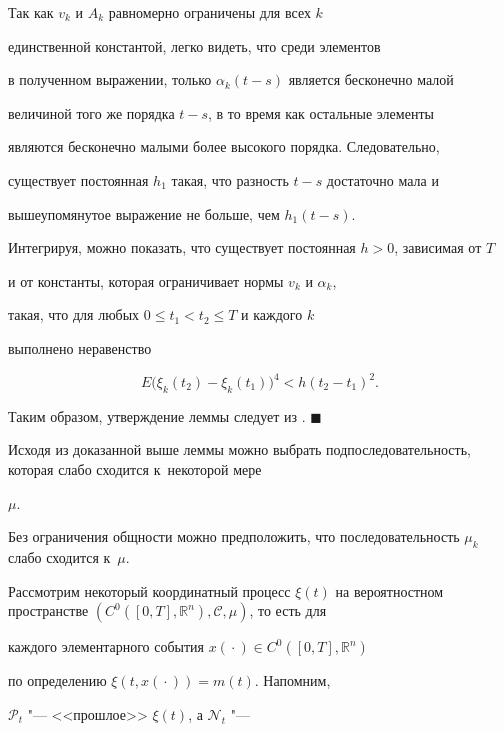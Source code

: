               Так как $v_k$ и $A_k$ равномерно ограничены для всех $k$

              единственной константой, легко видеть, что среди элементов

              в полученном выражении, только $\alpha_k(t-s)$ является бесконечно малой

              величиной того же порядка $t-s$, в то время как остальные элементы

              являются бесконечно малыми более высокого порядка. Следовательно,

              существует постоянная $h_1$ такая, что разность $t-s$ достаточно мала и

              вышеупомянутое выражение не больше, чем  $h_1(t-s)$.

              Интегрируя, можно показать, что существует постоянная  $h>0$, зависимая от $T$

              и от константы, которая ограничивает нормы $v_k$ и $\alpha_k$,

              такая, что для любых ${0\le t_1< t_2\le T}$ и каждого $k$

              выполнено неравенство 

              $$E\bigl(\xi_k(t_2)-\xi_k(t_1)\bigr)^4 < h(t_2-t_1)^2.$$

              Таким образом, утверждение леммы следует из  \cite[теорема~2, \S~1, гл.~VI]{popovkoval:bib:GS}. $\blacksquare$



\smallskip              

              



Исходя из доказанной выше  леммы можно выбрать подпоследовательность, которая слабо сходится к~некоторой мере

$\mu$. 

Без ограничения общности можно предположить, что последовательность $\mu_k$ слабо сходится к~$\mu$. 

Рассмотрим некоторый координатный процесс $\xi(t)$  на  вероятностном  пространстве $(C^0([0,T],  \mathbb{R}^n),  \mathcal{C},\mu)$,  то есть для

каждого элементарного события $x({}\cdot{})\in C^0([0,T],\mathbb{R}^n)$

по  определению  $\xi(t,x({}\cdot{}))=m(t)$. Напомним,

$\mathcal{P}_t$ "--- <<прош\-лое>> $\xi(t)$, а $\mathcal{N}_t$ "---

